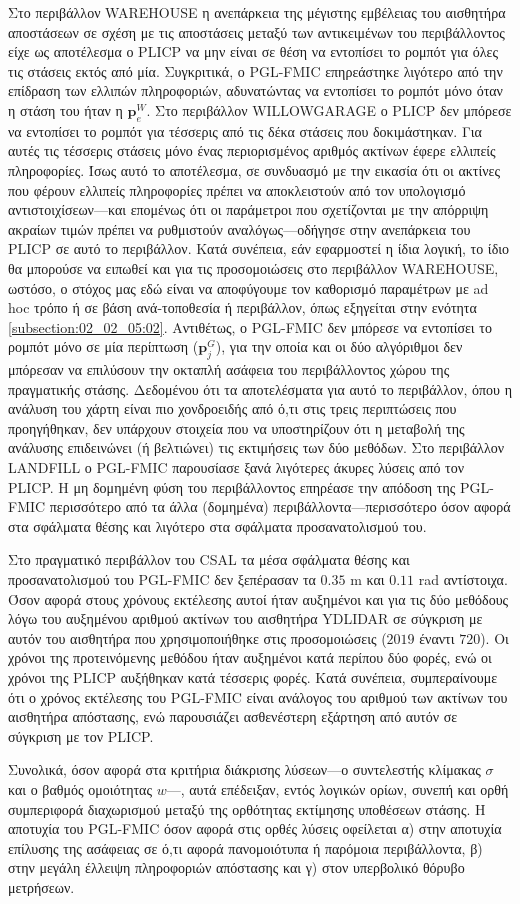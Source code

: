 Στο περιβάλλον WAREHOUSE η ανεπάρκεια της μέγιστης εμβέλειας του αισθητήρα
αποστάσεων σε σχέση με τις αποστάσεις μεταξύ των αντικειμένων του περιβάλλοντος
είχε ως αποτέλεσμα ο PLICP να μην είναι σε θέση να εντοπίσει το ρομπότ για όλες
τις στάσεις εκτός από μία. Συγκριτικά, ο PGL-FMIC επηρεάστηκε λιγότερο από την
επίδραση των ελλιπών πληροφοριών, αδυνατώντας να εντοπίσει το ρομπότ μόνο όταν
η στάση του ήταν η $\bm{p}_e^W$.  Στο περιβάλλον WILLOWGARAGE ο PLICP δεν
μπόρεσε να εντοπίσει το ρομπότ για τέσσερις από τις δέκα στάσεις που
δοκιμάστηκαν. Για αυτές τις τέσσερις στάσεις μόνο ένας περιορισμένος αριθμός
ακτίνων έφερε ελλιπείς πληροφορίες.  Ίσως αυτό το αποτέλεσμα, σε συνδυασμό με
την εικασία ότι οι ακτίνες που φέρουν ελλιπείς πληροφορίες πρέπει να
αποκλειστούν από τον υπολογισμό αντιστοιχίσεων---και επομένως ότι οι παράμετροι
που σχετίζονται με την απόρριψη ακραίων τιμών πρέπει να ρυθμιστούν
αναλόγως---οδήγησε στην ανεπάρκεια του PLICP σε αυτό το περιβάλλον. Κατά
συνέπεια, εάν εφαρμοστεί η ίδια λογική, το ίδιο θα μπορούσε να ειπωθεί και για
τις προσομοιώσεις στο περιβάλλον WAREHOUSE, ωστόσο, ο στόχος μας εδώ είναι να
αποφύγουμε τον καθορισμό παραμέτρων με ad hoc τρόπο ή σε βάση ανά-τοποθεσία ή
περιβάλλον, όπως εξηγείται στην ενότητα \ref{subsection:02_02_05:02}.
Αντιθέτως, ο PGL-FMIC δεν μπόρεσε να εντοπίσει το ρομπότ μόνο σε μία περίπτωση
($\bm{p}_j^G$), για την οποία και οι δύο αλγόριθμοι δεν μπόρεσαν να επιλύσουν
την οκταπλή ασάφεια του περιβάλλοντος χώρου της πραγματικής στάσης. Δεδομένου
ότι τα αποτελέσματα για αυτό το περιβάλλον, όπου η ανάλυση του χάρτη είναι πιο
χονδροειδής από ό,τι στις τρεις περιπτώσεις που προηγήθηκαν, δεν υπάρχουν
στοιχεία που να υποστηρίζουν ότι η μεταβολή της ανάλυσης επιδεινώνει (ή
βελτιώνει) τις εκτιμήσεις των δύο μεθόδων.  Στο περιβάλλον LANDFILL ο PGL-FMIC
παρουσίασε ξανά λιγότερες άκυρες λύσεις από τον PLICP.  Η μη δομημένη φύση του
περιβάλλοντος επηρέασε την απόδοση της PGL-FMIC περισσότερο από τα άλλα
(δομημένα) περιβάλλοντα---περισσότερο όσον αφορά στα σφάλματα θέσης και
λιγότερο στα σφάλματα προσανατολισμού του.

Στο πραγματικό περιβάλλον του CSAL τα μέσα σφάλματα θέσης και προσανατολισμού
του PGL-FMIC δεν ξεπέρασαν τα $0.35$ m και $0.11$ rad αντίστοιχα. Όσον
αφορά στους χρόνους εκτέλεσης αυτοί ήταν αυξημένοι και για τις δύο
μεθόδους λόγω του αυξημένου αριθμού ακτίνων του αισθητήρα YDLIDAR
σε σύγκριση με αυτόν του αισθητήρα που χρησιμοποιήθηκε στις προσομοιώσεις
($2019$ έναντι $720$). Οι χρόνοι της προτεινόμενης μεθόδου ήταν αυξημένοι
κατά περίπου δύο φορές, ενώ οι χρόνοι της PLICP αυξήθηκαν κατά τέσσερις φορές.
Κατά συνέπεια, συμπεραίνουμε ότι ο χρόνος εκτέλεσης του PGL-FMIC είναι ανάλογος
του αριθμού των ακτίνων του αισθητήρα απόστασης, ενώ παρουσιάζει ασθενέστερη
εξάρτηση από αυτόν σε σύγκριση με τον PLICP.

Συνολικά, όσον αφορά στα κριτήρια διάκρισης λύσεων---ο συντελεστής κλίμακας
$\sigma$ και ο βαθμός ομοιότητας $w$---, αυτά επέδειξαν, εντός λογικών ορίων,
συνεπή και ορθή συμπεριφορά διαχωρισμού μεταξύ της ορθότητας εκτίμησης
υποθέσεων στάσης. Η αποτυχία του PGL-FMIC όσον αφορά στις ορθές λύσεις
οφείλεται α) στην αποτυχία επίλυσης της ασάφειας σε ό,τι αφορά πανομοιότυπα ή
παρόμοια περιβάλλοντα, β) στην μεγάλη έλλειψη πληροφοριών απόστασης και γ) στον
υπερβολικό θόρυβο μετρήσεων.
